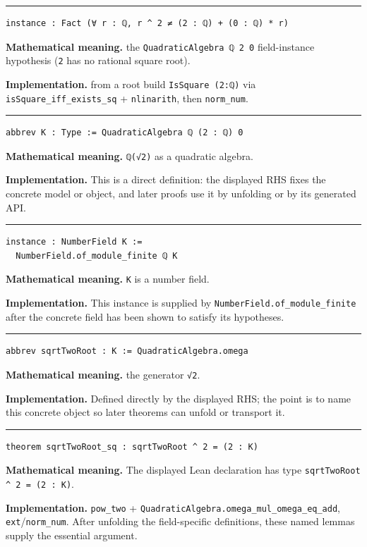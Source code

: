 \documentclass[UTF8,a4paper,11pt,fontset=fandol]{ctexart}
\theoremstyle{definition}
\newcommand{\statementsep}{\par\medskip\hrule\medskip}
\begin{document}
\statementsep
\begin{verbatim}
instance : Fact (∀ r : ℚ, r ^ 2 ≠ (2 : ℚ) + (0 : ℚ) * r)
\end{verbatim}
\noindent\textbf{Mathematical meaning.} the \texttt{QuadraticAlgebra ℚ 2 0} field-instance hypothesis (\texttt{2} has no rational square root).\par
\noindent\textbf{Implementation.} from a root build \texttt{IsSquare (2:ℚ)} via \texttt{isSquare\_\allowbreak{}iff\_\allowbreak{}exists\_\allowbreak{}sq} + \texttt{nlinarith}, then \texttt{norm\_\allowbreak{}num}.\par
\statementsep
\begin{verbatim}
abbrev K : Type := QuadraticAlgebra ℚ (2 : ℚ) 0
\end{verbatim}
\noindent\textbf{Mathematical meaning.} \texttt{ℚ(√2)} as a quadratic algebra.\par
\noindent\textbf{Implementation.} This is a direct definition: the displayed RHS fixes the concrete model or object, and later proofs use it by unfolding or by its generated API.\par
\statementsep
\begin{verbatim}
instance : NumberField K :=
  NumberField.of_module_finite ℚ K
\end{verbatim}
\noindent\textbf{Mathematical meaning.} \texttt{K} is a number field.\par
\noindent\textbf{Implementation.} This instance is supplied by \texttt{NumberField.\allowbreak{}of\_\allowbreak{}module\_\allowbreak{}finite} after the concrete field has been shown to satisfy its hypotheses.\par
\statementsep
\begin{verbatim}
abbrev sqrtTwoRoot : K := QuadraticAlgebra.omega
\end{verbatim}
\noindent\textbf{Mathematical meaning.} the generator \texttt{√2}.\par
\noindent\textbf{Implementation.} Defined directly by the displayed RHS; the point is to name this concrete object so later theorems can unfold or transport it.\par
\statementsep
\begin{verbatim}
theorem sqrtTwoRoot_sq : sqrtTwoRoot ^ 2 = (2 : K)
\end{verbatim}
\noindent\textbf{Mathematical meaning.} The displayed Lean declaration has type \texttt{sqrtTwoRoot \textasciicircum{} 2 = (2 : K)}.\par
\noindent\textbf{Implementation.} \texttt{pow\_\allowbreak{}two} + \texttt{QuadraticAlgebra.\allowbreak{}omega\_\allowbreak{}mul\_\allowbreak{}omega\_\allowbreak{}eq\_\allowbreak{}add}, \texttt{ext}/\texttt{norm\_\allowbreak{}num}. After unfolding the field-specific definitions, these named lemmas supply the essential argument.\par
\end{document}
